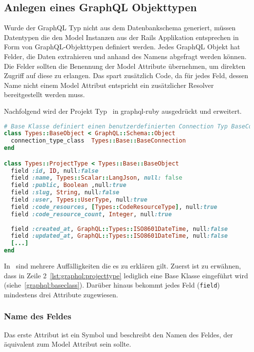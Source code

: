 \subsection{Anlegen eines GraphQL Objekttypen}
\label{impl:graphql:graphqltype}
\label{graphql:objecttype}
Wurde der GraphQL Typ nicht aus dem Datenbankschema generiert, müssen Datentypen die den Model Instanzen aus der Rails Applikation entsprechen in Form von GraphQL-Objekttypen definiert werden. 
Jedes GraphQL Objekt hat Felder, die Daten extrahieren und anhand des Namens abgefragt werden können. 
Die Felder sollten die Benennung der Model Attribute übernehmen, um direkten Zugriff auf diese zu erlangen. Das spart zusätzlich Code, da für jedes Feld, dessen Name nicht einem Model Attribut entspricht ein zusätzlicher Resolver bereitgestellt werden muss.

Nachfolgend wird der Projekt Typ~ in graphql-ruby ausgedrückt und erweitert.

\begin{lstlisting}[language=Ruby,float=h!,caption={Definition des ProjectTypes zum Abbilden von Project Model Instanzen}, label={lst:graphql:projecttype}]
# Base Klasse definiert einen benutzerdefinierten Connection Typ BaseConnection 
class Types::BaseObject < GraphQL::Schema::Object
  connection_type_class  Types::Base::BaseConnection
end

class Types::ProjectType < Types::Base::BaseObject
  field :id, ID, null:false
  field :name, Types::Scalar::LangJson, null: false
  field :public, Boolean ,null:true
  field :slug, String, null:false
  field :user, Types::UserType, null:true
  field :code_resources, [Types::CodeResourceType], null:true
  field :code_resource_count, Integer, null:true
  
  field :created_at, GraphQL::Types::ISO8601DateTime, null:false
  field :updated_at, GraphQL::Types::ISO8601DateTime, null:false
  [...]
end
\end{lstlisting}

In~ sind mehrere Auffälligkeiten die es zu erklären gilt.
Zuerst ist zu erwähnen, dass in Zeile 2~\ref{lst:graphql:projecttype} lediglich eine Base Klasse eingeführt wird (siehe~\ref{graphql:baseclass}).
Darüber hinaus bekommt jedes Feld (\lstinline|field|) mindestens drei Attribute zugewiesen. 

\subsubsection{Name des Feldes}
Das erste Attribut ist ein Symbol und beschreibt den Namen des Feldes, der äquivalent zum Model Attribut sein sollte. 

